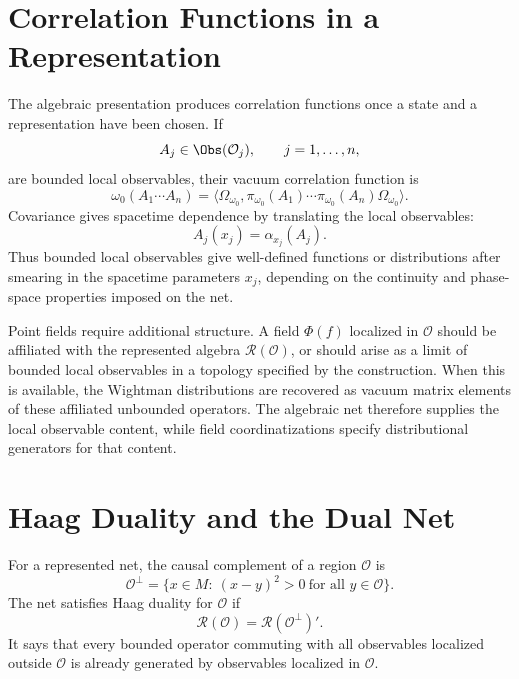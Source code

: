\section{Correlation Functions in a Representation}

The algebraic presentation produces correlation functions once a state and a
representation have been chosen.  If
\[
  A_j\in\Obs(\mathcal O_j),
  \qquad j=1,\ldots,n,
\]
are bounded local observables, their vacuum correlation function is
\[
  \omega_0(A_1\cdots A_n)
  =
  \langle\Omega_{\omega_0},
  \pi_{\omega_0}(A_1)\cdots\pi_{\omega_0}(A_n)
  \Omega_{\omega_0}\rangle .
\]
Covariance gives spacetime dependence by translating the local observables:
\[
  A_j(x_j)=\alpha_{x_j}(A_j).
\]
Thus bounded local observables give well-defined functions or distributions
after smearing in the spacetime parameters \(x_j\), depending on the
continuity and phase-space properties imposed on the net.

Point fields require additional structure.  A field \(\Phi(f)\) localized in
\(\mathcal O\) should be affiliated with the represented algebra
\(\mathcal R(\mathcal O)\), or
should arise as a limit of bounded local observables in a topology specified
by the construction.  When this is available, the Wightman distributions are
recovered as vacuum matrix elements of these affiliated unbounded operators.
The algebraic net therefore supplies the local observable content, while
field coordinatizations specify distributional generators for that content.

\section{Haag Duality and the Dual Net}

\begin{definition}
\label{def:haag-duality}
For a represented net, the causal complement of a region \(\mathcal O\) is
\[
  \mathcal O^\perp
  =
  \{x\in M:\ (x-y)^2>0\ \text{for all }y\in\mathcal O\}.
\]
The net satisfies Haag duality for \(\mathcal O\) if
\begin{equation}
  \mathcal R(\mathcal O)=\mathcal R(\mathcal O^\perp)' .
  \label{eq:haag-duality}
\end{equation}
It says that every bounded operator commuting with all observables localized
outside \(\mathcal O\) is already generated by observables localized in
\(\mathcal O\).
\end{definition}

